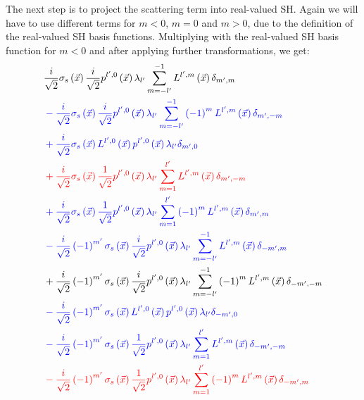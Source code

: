 \documentclass[10pt]{scrartcl}
\begin{document}
The next step is to project the scattering term into real-valued SH. Again we will have to use different terms for $m<0$, $m=0$ and $m>0$, due to the definition of the real-valued SH basis functions. Multiplying with the real-valued SH basis function for $m<0$ and after applying further transformations, we get:
\begin{align*}
&
\frac{i}{\sqrt{2}}\sigma_s\left (\vec{x} \right )\frac{i}{\sqrt{2}}p^{{l',0}}\left (\vec{x} \right )\lambda_{{l'}}\sum_{m=-l'}^{-1}{L^{{l',m}}\left (\vec{x} \right )\delta_{m',m}}
\\&
\mathcolor{blue}
{
-\frac{i}{\sqrt{2}}\sigma_s\left (\vec{x} \right )\frac{i}{\sqrt{2}}p^{{l',0}}\left (\vec{x} \right )\lambda_{{l'}}\sum_{m=-l'}^{-1}{\left({-1}\right)^{m}L^{{l',m}}\left (\vec{x} \right )\delta_{m',-m}}
}
\\&
\mathcolor{blue}
{
+\frac{i}{\sqrt{2}}\sigma_s\left (\vec{x} \right )L^{{l',0}}\left (\vec{x} \right )p^{{l',0}}\left (\vec{x} \right )\lambda_{{l'}}\delta_{m',0}
}
\\&
\mathcolor{red}
{
+\frac{i}{\sqrt{2}}\sigma_s\left (\vec{x} \right )\frac{1}{\sqrt{2}}p^{{l',0}}\left (\vec{x} \right )\lambda_{{l'}}\sum_{m=1}^{l'}{L^{{l',m}}\left (\vec{x} \right )\delta_{m',-m}}
}
\\&
\mathcolor{blue}
{
+\frac{i}{\sqrt{2}}\sigma_s\left (\vec{x} \right )\frac{1}{\sqrt{2}}p^{{l',0}}\left (\vec{x} \right )\lambda_{{l'}}\sum_{m=1}^{l'}{\left({-1}\right)^{m}L^{{l',m}}\left (\vec{x} \right )\delta_{m',m}}
}
\\&
\mathcolor{blue}
{
-\frac{i}{\sqrt{2}}\left({-1}\right)^{m'}\sigma_s\left (\vec{x} \right )\frac{i}{\sqrt{2}}p^{{l',0}}\left (\vec{x} \right )\lambda_{{l'}}\sum_{m=-l'}^{-1}{L^{{l',m}}\left (\vec{x} \right )\delta_{-m',m}}
}
\\&
+\frac{i}{\sqrt{2}}\left({-1}\right)^{m'}\sigma_s\left (\vec{x} \right )\frac{i}{\sqrt{2}}p^{{l',0}}\left (\vec{x} \right )\lambda_{{l'}}\sum_{m=-l'}^{-1}{\left({-1}\right)^{m}L^{{l',m}}\left (\vec{x} \right )\delta_{-m',-m}}
\\&
\mathcolor{blue}
{
-\frac{i}{\sqrt{2}}\left({-1}\right)^{m'}\sigma_s\left (\vec{x} \right )L^{{l',0}}\left (\vec{x} \right )p^{{l',0}}\left (\vec{x} \right )\lambda_{{l'}}\delta_{-m',0}
}
\\&
\mathcolor{blue}
{
-\frac{i}{\sqrt{2}}\left({-1}\right)^{m'}\sigma_s\left (\vec{x} \right )\frac{1}{\sqrt{2}}p^{{l',0}}\left (\vec{x} \right )\lambda_{{l'}}\sum_{m=1}^{l'}{L^{{l',m}}\left (\vec{x} \right )\delta_{-m',-m}}
}
\\&
\mathcolor{red}
{
-\frac{i}{\sqrt{2}}\left({-1}\right)^{m'}\sigma_s\left (\vec{x} \right )\frac{1}{\sqrt{2}}p^{{l',0}}\left (\vec{x} \right )\lambda_{{l'}}\sum_{m=1}^{l'}{\left({-1}\right)^{m}L^{{l',m}}\left (\vec{x} \right )\delta_{-m',m}}
}
\end{align*}
\end{document}
